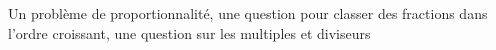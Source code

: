 \documentclass[a4paper,11pt,fleqn]{article}
\begin{document}
        


    Un problème de proportionnalité, une question pour classer des fractions dans l'ordre croissant, une question sur les multiples et diviseurs
\end{document}
